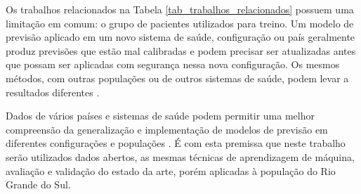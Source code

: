 Os trabalhos relacionados na Tabela \ref{tab_trabalhos_relacionados} possuem uma limitação em comum: o grupo de pacientes utilizados para treino. Um modelo de previsão aplicado em um novo sistema de saúde,
configuração ou país geralmente produz previsões que estão mal calibradas e podem precisar ser atualizadas antes que possam ser aplicadas com segurança nessa nova configuração. 
Os mesmos métodos, com outras populações ou de outros sistemas de saúde, podem levar a resultados diferentes  \cite{assaf2020utilization, cheng2020using, zhao2020prediction, casiraghi2020explainable}. 

Dados de vários países e sistemas de saúde podem permitir uma melhor compreensão da generalização e implementação de modelos de previsão em diferentes configurações e populações \cite{wynants2020prediction}. É com esta premissa que
neste trabalho serão utilizados dados abertos, as mesmas técnicas de aprendizagem de máquina, avaliação e validação do estado da arte, porém aplicadas à população do Rio Grande do Sul.


